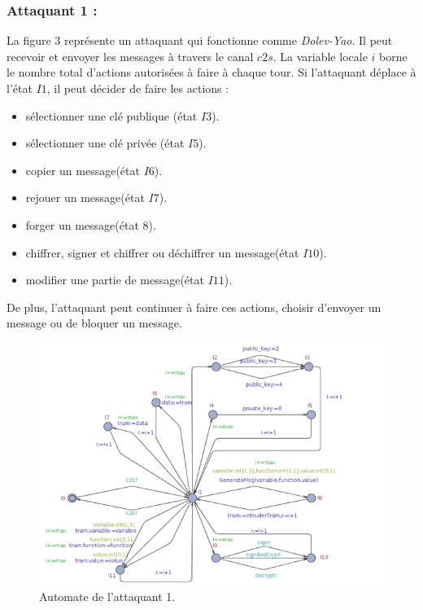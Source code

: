 \documentclass[10pt,a4paper]{article}
\begin{document}
\subsubsection{Attaquant 1 :}
La figure 3 représente un attaquant qui fonctionne comme \textit{Dolev-Yao}. Il peut recevoir et envoyer les messages à travers le canal $c2s$. La variable locale $i$ borne le nombre total d'actions autorisées à faire à chaque tour. Si l'attaquant déplace à l'état $I1$, il peut décider de faire les actions :
\begin{itemize}
\item sélectionner une clé publique (état $I3$).
\item sélectionner une clé privée (état $I5$).
\item copier un message(état $I6$).
\item rejouer un message(état $I7$).
\item forger un message(état $8$).
\item chiffrer, signer et chiffrer ou déchiffrer un message(état $I10$).
\item modifier une partie de message(état $I11$).
\end{itemize}
De plus, l'attaquant peut continuer à faire ces actions, choisir d'envoyer un message ou de bloquer un message.        
\begin{figure}[!h]
\centering 
\includegraphics[scale=0.5]{img/attaquant1-600.png}
\caption{Automate de l'attaquant 1.}
\end{figure}
\end{document}
